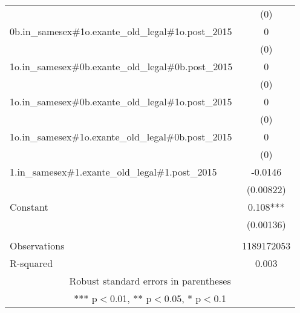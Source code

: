 \documentclass[]{article}
\begin{document}
\begin{tabular}{lc}
 & (0) \\
0b.in\_samesex\#1o.exante\_old\_legal\#1o.post\_2015 & 0 \\
 & (0) \\
1o.in\_samesex\#0b.exante\_old\_legal\#0b.post\_2015 & 0 \\
 & (0) \\
1o.in\_samesex\#0b.exante\_old\_legal\#1o.post\_2015 & 0 \\
 & (0) \\
1o.in\_samesex\#1o.exante\_old\_legal\#0b.post\_2015 & 0 \\
 & (0) \\
1.in\_samesex\#1.exante\_old\_legal\#1.post\_2015 & -0.0146 \\
 & (0.00822) \\
Constant & 0.108*** \\
 & (0.00136) \\
 &  \\
Observations & 1189172053 \\
 R-squared & 0.003 \\ \hline
\multicolumn{2}{c}{ Robust standard errors in parentheses} \\
\multicolumn{2}{c}{ *** p$<$0.01, ** p$<$0.05, * p$<$0.1} \\
\end{tabular}
\end{document}
